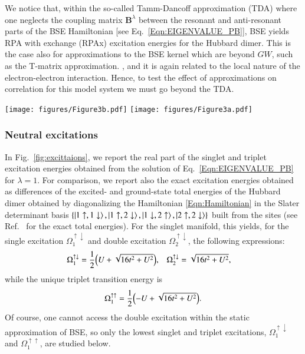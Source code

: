 \documentclass[aps,prb,reprint,superscriptaddress]{revtex4-1}
\newcommand{\IS}{\lambda}
\newcommand{\singlet}{\uparrow\downarrow}
\newcommand{\triplet}{\uparrow\uparrow}
\newcommand{\Om}[2]{\Omega_{#1}^{#2}}
\newcommand{\bB}[1]{\boldsymbol{B}^{#1}}
\begin{document}
We notice that, within the so-called Tamm-Dancoff approximation (TDA) where one neglects the coupling matrix $\bB{\IS}$ between the resonant and anti-resonant parts of the BSE Hamiltonian [see Eq.~\eqref{Eqn:EIGENVALUE_PB}], BSE yields RPA with exchange (RPAx) excitation energies for the Hubbard dimer. This is the case also for approximations to the BSE kernel which are beyond $GW$, such as the T-matrix approximation. \citep{Romaniello_2012,Zhang_2017,Li_2021b}, and it is again related to the local nature of the electron-electron interaction. Hence, to test the effect of approximations on correlation for this model system we must go beyond the TDA.


\begin{figure*}
  \texttt{[image: figures/Figure3b.pdf]}
  \texttt{[image: figures/Figure3a.pdf]}
 \caption{Real and imaginary parts of the singlet (solid) and triplet (dotted) neutral excitations, $\Om{1}{\singlet}$ and $\Om{1}{\triplet}$, as functions of $U/t$: exact (black), BSE with exact quasiparticle energies and $W_\text{HF}$ (gray), BSE@$G_\text{HF}W_\text{HF}$ (red).}
\label{fig:excittaions}
\end{figure*}

\subsubsection{Neutral excitations}
In Fig.~\ref{fig:excittaions}, we report the real part of the singlet and triplet excitation energies obtained from the solution of Eq.~\eqref{Eqn:EIGENVALUE_PB} for $\IS=1$. For comparison, we report also the exact excitation energies obtained as differences of the excited- and ground-state total energies of the Hubbard dimer obtained by diagonalizing the Hamiltonian \eqref{Eqn:Hamiltonian} in the Slater determinant basis $\{ \ket{1\uparrow,1\downarrow}, \ket{1\uparrow,2\downarrow},\ket{1\downarrow,2\uparrow},\ket{2\uparrow,2\downarrow}\}$ built from the sites (see Ref.~\citep{Romaniello_2009a} for the exact total energies).
For the singlet manifold, this yields, for the single excitation $\Om{1}{\singlet}$ and double excitation $\Om{2}{\singlet}$, the following expressions:
\begin{align}
	\label{eqn:exSinglet}
	\Om{1}{\singlet} & = \frac{1}{2}\qty(U+\sqrt{16 t^2 + U^2}), 
	&
	\Om{2}{\singlet} & = \sqrt{16 t^2 + U^2},
\end{align}
while the unique triplet transition energy is
\begin{equation}
	\label{eqn:exTriplet}
	\Om{1}{\triplet} = \frac{1}{2}\qty(-U+\sqrt{16 t^2 + U^2}).
\end{equation}
Of course, one cannot access the double excitation within the static approximation of BSE, \citep{Strinati_1988,Romaniello_2009b,Loos_2020h} so only the lowest singlet and triplet excitations, $\Om{1}{\singlet}$ and $\Om{1}{\triplet}$, are studied below.
\end{document}
